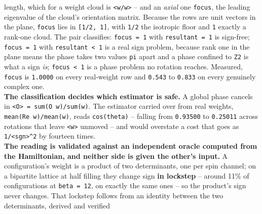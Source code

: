 \documentclass[10pt,letterpaper,twocolumn]{article}
\begin{document}
{length, which for a weight cloud is \texttt{\textbar{}\allowbreak{}\textless{}\allowbreak{}w/\allowbreak{}\textbar{}\allowbreak{}w\textbar{}\allowbreak{}\textgreater{}\allowbreak{}\textbar{}\allowbreak{}} -- and an \emph{axial} one \texttt{focus}, the leading
eigenvalue of the cloud's orientation matrix. Because the rows are unit vectors in the plane,
\texttt{focus} lies in \texttt{[\allowbreak{}1/\allowbreak{}2,\allowbreak{}\ 1]\allowbreak{}}, with \texttt{1/\allowbreak{}2} the isotropic floor and \texttt{1} exactly a rank-one cloud. The
pair classifies: \texttt{focus\ =\allowbreak{}\ 1} with \texttt{resultant\ =\allowbreak{}\ 1} is sign-free; \texttt{focus\ =\allowbreak{}\ 1} with \texttt{resultant\ \textless{}\allowbreak{}\ 1} is
a real sign problem, because rank one in the plane means the phase takes two values \texttt{pi} apart and
a phase confined to \texttt{Z2} is what a sign \emph{is}; \texttt{focus\ \textless{}\allowbreak{}\ 1} is a phase problem no rotation reaches.
Measured, \texttt{focus} is \texttt{1.\allowbreak{}0000} on every real-weight row and \texttt{0.\allowbreak{}543} to \texttt{0.\allowbreak{}833} on every genuinely
complex one.\\
\textbf{The classification decides which estimator is safe.} A global phase cancels in
\texttt{\textless{}\allowbreak{}O\textgreater{}\allowbreak{}\ =\allowbreak{}\ sum(\allowbreak{}O\ w)\allowbreak{}/\allowbreak{}sum(\allowbreak{}w)\allowbreak{}}. The estimator carried over from real weights,
\texttt{mean(\allowbreak{}Re\ w)\allowbreak{}/\allowbreak{}mean(\allowbreak{}\textbar{}\allowbreak{}w\textbar{}\allowbreak{})\allowbreak{}}, reads \texttt{cos(\allowbreak{}theta)\allowbreak{}} -- falling from \texttt{0.\allowbreak{}93500} to \texttt{0.\allowbreak{}25011} across
rotations that leave \texttt{\textbar{}\allowbreak{}\textless{}\allowbreak{}w\textgreater{}\allowbreak{}\textbar{}\allowbreak{}} unmoved -- and would overstate a cost that goes as \texttt{1/\allowbreak{}\textless{}\allowbreak{}sgn\textgreater{}\allowbreak{}\^{}2} by
fourteen times.\\
\textbf{The reading is validated against an independent oracle computed from the Hamiltonian, and neither
side is given the other's input.} A configuration's weight is a product of two determinants, one
per spin channel; on a bipartite lattice at half filling they change sign \textbf{in lockstep} -- around
11\% of configurations at \texttt{beta\ =\allowbreak{}\ 12}, on exactly the same ones -- so the product's sign never
changes. That lockstep follows from an identity between the two determinants, derived and verified
}
\end{document}
